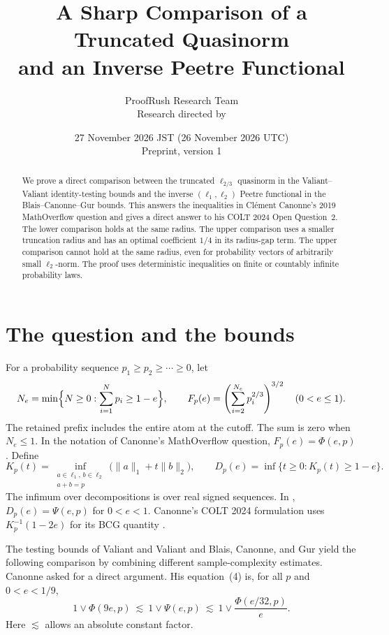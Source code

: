 \documentclass[11pt]{article}
\title{A Sharp Comparison of a Truncated Quasinorm\\ and an Inverse Peetre Functional}
\author{ProofRush Research Team\\\small Research directed by \director}
\date{27 November 2026 JST (26 November 2026 UTC)\\\small Preprint, version 1}
\newcommand{\F}{F_p}
\newcommand{\D}{D_p}
\begin{document}
\maketitle

\begin{abstract}
We prove a direct comparison between the truncated \(\ell_{2/3}\)
quasinorm in the Valiant--Valiant identity-testing bounds and the inverse
\((\ell_1,\ell_2)\) Peetre functional in the Blais--Canonne--Gur bounds.
This answers the inequalities in Clément Canonne's 2019 MathOverflow
question and gives a direct answer to his COLT 2024 Open Question~2.
The lower comparison holds at the same radius. The upper comparison
uses a smaller truncation radius and has an optimal coefficient \(1/4\)
in its radius-gap term. The upper comparison cannot hold at the same
radius, even for probability vectors of arbitrarily small
\(\ell_2\)-norm. The proof uses deterministic inequalities on finite
or countably infinite probability laws.
\end{abstract}

\section{The question and the bounds}
For a probability sequence \(p_1\ge p_2\ge\cdots\ge0\), let
\[
 N_e=\min\Bigl\{N\ge0:\sum_{i=1}^N p_i\ge1-e\Bigr\},
 \qquad
 \F(e)=\left(\sum_{i=2}^{N_e}p_i^{2/3}\right)^{3/2}
 \quad (0<e\le1).
\]
The retained prefix includes the entire atom at the cutoff. The sum is
zero when \(N_e\le1\). In the notation of Canonne's MathOverflow question,
\(\F(e)=\Phi(e,p)\) \cite{mo}. Define
\[
 K_p(t)=\inf_{\substack{a\in\ell_1,\,b\in\ell_2\\a+b=p}}
                 \bigl(\|a\|_1+t\|b\|_2\bigr),\qquad
 \D(e)=\inf\{t\ge0:K_p(t)\ge1-e\}.
\]
The infimum over decompositions is over real signed sequences. In
\cite{mo}, \(\D(e)=\Psi(e,p)\) for \(0<e<1\). Canonne's COLT 2024
formulation uses \(K_p^{-1}(1-2e)\) for its BCG quantity \cite{colt}.

The testing bounds of Valiant and Valiant \cite{vv} and Blais, Canonne,
and Gur \cite{bcg} yield the following comparison by combining
different sample-complexity estimates. Canonne asked for a direct
argument. His equation~(4) is, for all \(p\) and \(0<e<1/9\),
\begin{equation}\label{moeq}
 1\vee\Phi(9e,p)\ \lesssim\ 1\vee\Psi(e,p)\
   \lesssim\ 1\vee \frac{\Phi(e/32,p)}{e}.
\end{equation}
Here \(\lesssim\) allows an absolute constant factor.
\end{document}
